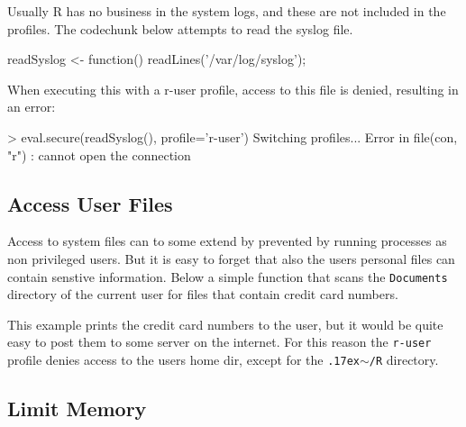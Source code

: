 \documentclass[article]{jss}
\begin{document}
\begin{appendices}
Usually R has no business in the system logs, and these are not included in the
profiles. The codechunk below attempts to read the syslog file.
\begin{CodeChunk}
\begin{CodeInput}
readSyslog <- function(){
	readLines('/var/log/syslog');
}
\end{CodeInput}
\end{CodeChunk}
When executing this with a r-user profile, access to this file is denied,
resulting in an error:
\begin{CodeChunk}
\begin{CodeInput}
> eval.secure(readSyslog(), profile='r-user')
Switching profiles...
Error in file(con, "r") : cannot open the connection
\end{CodeInput}
\end{CodeChunk}

\subsection{Access User Files}
\label{creditcard}

Access to system files can to some extend by prevented by running processes as
non privileged users. But it is easy to forget that also the users personal
files can contain senstive information. Below a simple function that scans the
\texttt{Documents} directory of the current user for files that contain credit
card numbers. 

\begin{CodeChunk}
\end{CodeChunk}

This example prints the credit card numbers to the user, but it would be quite
easy to post them to some server on the internet. For this reason the
\texttt{r-user} profile denies access to the users home dir, except for the 
\texttt{{\raise.17ex\hbox{$\scriptstyle\sim$}}/R} directory.


\subsection{Limit Memory}


\end{appendices}
\end{document}
